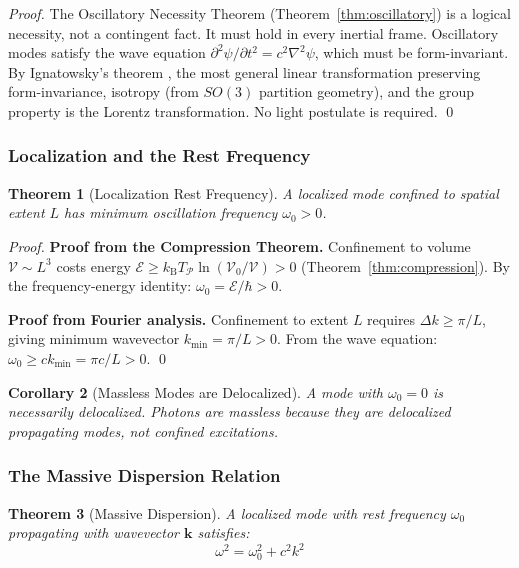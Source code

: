 \documentclass[twocolumn,10pt,a4paper]{article}
\newtheorem{theorem}{Theorem}[section]
\newtheorem{corollary}[theorem]{Corollary}
\theoremstyle{definition}
\theoremstyle{remark}
\newcommand{\kB}{k_{\mathrm{B}}}
\newcommand{\Cost}{\mathcal{E}}
\newcommand{\Partition}{\mathcal{P}}
\begin{document}
\begin{proof}
The Oscillatory Necessity Theorem (Theorem~\ref{thm:oscillatory}) is a logical necessity, not a contingent fact. It must hold in every inertial frame. Oscillatory modes satisfy the wave equation $\partial^2\psi/\partial t^2 = c^2\nabla^2\psi$, which must be form-invariant. By Ignatowsky's theorem \citep{ignatowsky1910,frank1911}, the most general linear transformation preserving form-invariance, isotropy (from $SO(3)$ partition geometry), and the group property is the Lorentz transformation. No light postulate is required. \qed
\end{proof}

\subsubsection{Localization and the Rest Frequency}

\begin{theorem}[Localization Rest Frequency]
\label{thm:rest-freq}
A localized mode confined to spatial extent $L$ has minimum oscillation frequency $\omega_0 > 0$.
\end{theorem}

\begin{proof}
\textbf{Proof from the Compression Theorem.} Confinement to volume $\mathcal{V} \sim L^3$ costs energy $\Cost \geq \kB T_{\Partition} \ln(\mathcal{V}_0/\mathcal{V}) > 0$ (Theorem~\ref{thm:compression}). By the frequency-energy identity: $\omega_0 = \Cost/\hbar > 0$.

\textbf{Proof from Fourier analysis.} Confinement to extent $L$ requires $\Delta k \geq \pi/L$, giving minimum wavevector $k_{\min} = \pi/L > 0$. From the wave equation: $\omega_0 \geq ck_{\min} = \pi c/L > 0$. \qed
\end{proof}

\begin{corollary}[Massless Modes are Delocalized]
A mode with $\omega_0 = 0$ is necessarily delocalized. Photons are massless because they are delocalized propagating modes, not confined excitations.
\end{corollary}

\subsubsection{The Massive Dispersion Relation}

\begin{theorem}[Massive Dispersion]
\label{thm:dispersion}
A localized mode with rest frequency $\omega_0$ propagating with wavevector $\mathbf{k}$ satisfies:
\begin{equation}
    \omega^2 = \omega_0^2 + c^2k^2
    \label{eq:dispersion}
\end{equation}
\end{theorem}
\end{document}
